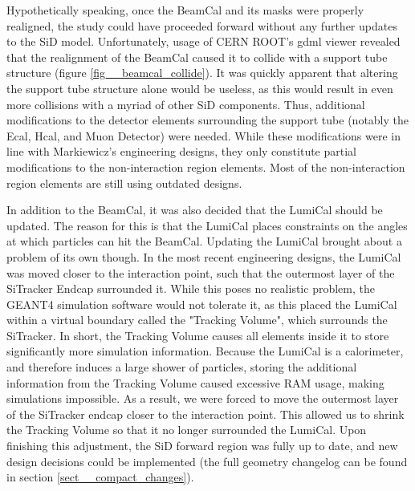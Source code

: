 \documentclass{report}
\begin{document}
            Hypothetically speaking, once the BeamCal and its masks were properly realigned, the study could have proceeded forward without any further updates to the SiD model. Unfortunately, usage of CERN ROOT's gdml viewer revealed that the realignment of the BeamCal caused it to collide with a support tube structure (figure \ref{fig__beamcal_collide}). It was quickly apparent that altering the support tube structure alone would be useless, as this would result in even more collisions with a myriad of other SiD components. Thus, additional modifications to the detector elements surrounding the support tube (notably the Ecal, Hcal, and Muon Detector) were needed. While these modifications were in line with Markiewicz's engineering designs, they only constitute partial modifications to the non-interaction region elements. Most of the non-interaction region elements are still using outdated designs.

            In addition to the BeamCal, it was also decided that the LumiCal should be updated. The reason for this is that the LumiCal places constraints on the angles at which particles can hit the BeamCal. Updating the LumiCal brought about a problem of its own though. In the most recent engineering designs, the LumiCal was moved closer to the interaction point, such that the outermost layer of the SiTracker Endcap surrounded it. While this poses no realistic problem, the GEANT4 simulation software would not tolerate it, as this placed the LumiCal within a virtual boundary called the "Tracking Volume", which surrounds the SiTracker. In short, the Tracking Volume causes all elements inside it to store significantly more simulation information. Because the LumiCal is a calorimeter, and therefore induces a large shower of particles, storing the additional information from the Tracking Volume caused excessive RAM usage, making simulations impossible. As a result, we were forced to move the outermost layer of the SiTracker endcap closer to the interaction point. This allowed us to shrink the Tracking Volume so that it no longer surrounded the LumiCal. Upon finishing this adjustment, the SiD forward region was fully up to date, and new design decisions could be implemented (the full geometry changelog can be found in section \ref{sect__compact_changes}).
\end{document}
